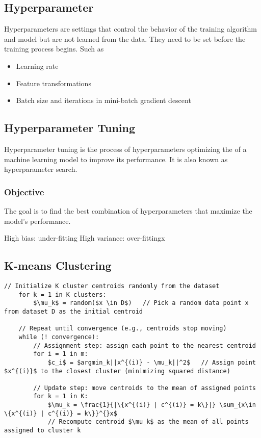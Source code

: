 \documentclass{article}
\begin{document}
\subsection*{Hyperparameter}
Hyperparameters are settings that control the behavior of the training algorithm and model but are not learned from the data. They need to be set before the training process begins. Such as 
\begin{itemize}
    \item Learning rate
    \item Feature transformations
    \item Batch size and iterations in mini-batch gradient descent
\end{itemize}
\subsection*{Hyperparameter Tuning}
Hyperparameter tuning is the process of hyperparameters optimizing the of a machine learning model to improve its performance. It is also known as hyperparameter search.
\subsubsection*{Objective} 
The goal is to find the best combination of hyperparameters that maximize the model's performance.

High bias: under-fitting 
High variance: over-fittingx    

\subsection*{K-means Clustering}
\begin{lstlisting}[mathescape = true]
    // Initialize K cluster centroids randomly from the dataset
    for k = 1 in K clusters:
        $\mu_k$ = random($x \in D$)   // Pick a random data point x from dataset D as the initial centroid
    
    // Repeat until convergence (e.g., centroids stop moving)
    while (! convergence):
        // Assignment step: assign each point to the nearest centroid
        for i = 1 in m:
            $c_i$ = $argmin_k||x^{(i)} - \mu_k||^2$   // Assign point $x^{(i)}$ to the closest cluster (minimizing squared distance)
    
        // Update step: move centroids to the mean of assigned points
        for k = 1 in K:
            $\mu_k = \frac{1}{|\{x^{(i)} | c^{(i)} = k\}|} \sum_{x\in \{x^{(i)} | c^{(i)} = k\}}^{}x$  
            // Recompute centroid $\mu_k$ as the mean of all points assigned to cluster k
    \end{lstlisting}
    
\end{document}
